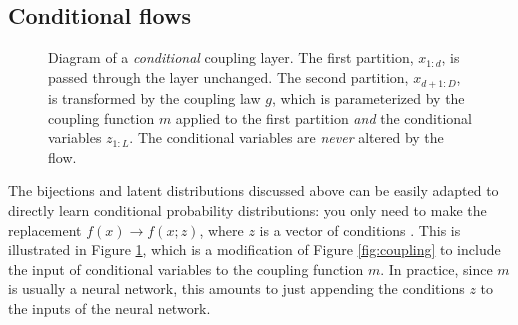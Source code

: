 \documentclass[twocolumn,twocolappendix,linenumbers]{aastex631}
\begin{document}
\subsection{Conditional flows}
\label{sec:conditional}

\begin{figure}
    \centering
    \caption{
        Diagram of a \emph{conditional} coupling layer.
        The first partition, $x^{}_{1:d}$, is passed through the layer unchanged.
        The second partition, $x^{}_{d+1:D}$, is transformed by the coupling law $g$, which is parameterized by the coupling function $m$ applied to the first partition \emph{and} the conditional variables $z^{}_{1:L}$.
        The conditional variables are \emph{never} altered by the flow.
    }
    \label{fig:conditional-coupling}
\end{figure}

The bijections and latent distributions discussed above can be easily adapted to directly learn conditional probability distributions:
you only need to make the replacement $f(x) \to f(x;z)$, where $z$ is a vector of conditions \citep{winkler2019}.
This is illustrated in Figure \ref{fig:conditional-coupling}, which is a modification of Figure \ref{fig:coupling} to include the input of conditional variables to the coupling function $m$.
In practice, since $m$ is usually a neural network, this amounts to just appending the conditions $z$ to the inputs of the neural network.
\end{document}
